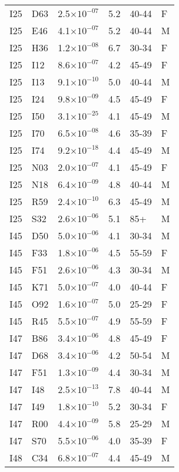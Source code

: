 \begin{longtable}{lllrll}
   I25 & D63 & 2.5$\times10^{-07}$ & 5.2 & 40-44 & F \\ 
   I25 & E46 & 4.1$\times10^{-07}$ & 5.2 & 40-44 & M \\ 
   I25 & H36 & 1.2$\times10^{-08}$ & 6.7 & 30-34 & F \\ 
   I25 & I12 & 8.6$\times10^{-07}$ & 4.2 & 45-49 & F \\ 
   I25 & I13 & 9.1$\times10^{-10}$ & 5.0 & 40-44 & M \\ 
   I25 & I24 & 9.8$\times10^{-09}$ & 4.5 & 45-49 & F \\ 
   I25 & I50 & 3.1$\times10^{-25}$ & 4.1 & 45-49 & M \\ 
   I25 & I70 & 6.5$\times10^{-08}$ & 4.6 & 35-39 & F \\ 
   I25 & I74 & 9.2$\times10^{-18}$ & 4.4 & 45-49 & M \\ 
   I25 & N03 & 2.0$\times10^{-07}$ & 4.1 & 45-49 & F \\ 
   I25 & N18 & 6.4$\times10^{-09}$ & 4.8 & 40-44 & M \\ 
   I25 & R59 & 2.4$\times10^{-10}$ & 6.3 & 45-49 & M \\ 
   I25 & S32 & 2.6$\times10^{-06}$ & 5.1 & 85+ & M \\ 
   I45 & D50 & 5.0$\times10^{-06}$ & 4.1 & 30-34 & M \\ 
   I45 & F33 & 1.8$\times10^{-06}$ & 4.5 & 55-59 & F \\ 
   I45 & F51 & 2.6$\times10^{-06}$ & 4.3 & 30-34 & M \\ 
   I45 & K71 & 5.0$\times10^{-07}$ & 4.0 & 40-44 & F \\ 
   I45 & O92 & 1.6$\times10^{-07}$ & 5.0 & 25-29 & F \\ 
   I45 & R45 & 5.5$\times10^{-07}$ & 4.9 & 55-59 & F \\ 
   I47 & B86 & 3.4$\times10^{-06}$ & 4.8 & 45-49 & F \\ 
   I47 & D68 & 3.4$\times10^{-06}$ & 4.2 & 50-54 & M \\ 
   I47 & F51 & 1.3$\times10^{-09}$ & 4.4 & 30-34 & M \\ 
   I47 & I48 & 2.5$\times10^{-13}$ & 7.8 & 40-44 & M \\ 
   I47 & I49 & 1.8$\times10^{-10}$ & 5.2 & 30-34 & F \\ 
   I47 & R00 & 4.4$\times10^{-09}$ & 5.8 & 25-29 & M \\ 
   I47 & S70 & 5.5$\times10^{-06}$ & 4.0 & 35-39 & F \\ 
   I48 & C34 & 6.8$\times10^{-07}$ & 4.4 & 45-49 & M \\ 

\end{longtable}
